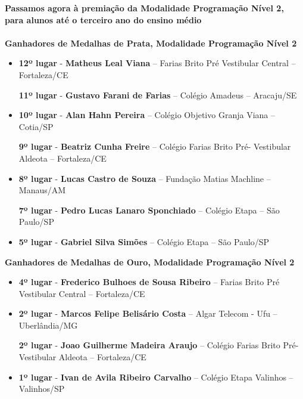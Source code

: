 \documentclass{article}
\begin{document}
\color{blue}
\textbf{Passamos agora à premiação da Modalidade Programação Nível 2, para alunos até o terceiro ano do ensino médio}\\\\
\textbf{\color{blue}Ganhadores de Medalhas de Prata, \color{black}Modalidade Programação Nível 2}
\color{black}

\begin{itemize}
\item
\textbf{12º lugar} - \textbf{Matheus Leal Viana} – Farias Brito Pré Vestibular Central – Fortaleza/CE


\textbf{11º lugar} - \textbf{Gustavo Farani de Farias} – Colégio Amadeus – Aracaju/SE



\item
\textbf{10º lugar} - \textbf{Alan Hahn Pereira} – Colégio Objetivo Granja Viana – Cotia/SP


\textbf{9º lugar} - \textbf{Beatriz Cunha Freire} – Colégio Farias Brito Pré- Vestibular Aldeota – Fortaleza/CE



\item
\textbf{8º lugar} - \textbf{Lucas Castro de Souza} – Fundação Matias Machline – Manaus/AM


\textbf{7º lugar} - \textbf{Pedro Lucas Lanaro Sponchiado} – Colégio Etapa – São Paulo/SP



\item
\textbf{5º lugar} - \textbf{Gabriel Silva Simões} – Colégio Etapa – São Paulo/SP



\end{itemize}

\textbf{\color{blue}Ganhadores de Medalhas de Ouro, \color{black}Modalidade Programação Nível 2}
\color{black}

\begin{itemize}
\item
\textbf{4º lugar} - \textbf{Frederico Bulhoes de Sousa Ribeiro} – Farias Brito Pré Vestibular Central – Fortaleza/CE



\item
\textbf{2º lugar} - \textbf{Marcos Felipe Belisário Costa} – Algar Telecom - Ufu – Uberlândia/MG


\textbf{2º lugar} - \textbf{Joao Guilherme Madeira Araujo} – Colégio Farias Brito Pré- Vestibular Aldeota – Fortaleza/CE



\item
\textbf{1º lugar} - \textbf{Ivan de Avila Ribeiro Carvalho} – Colégio Etapa Valinhos – Valinhos/SP



\end{itemize}
\bigskip
\end{document}
